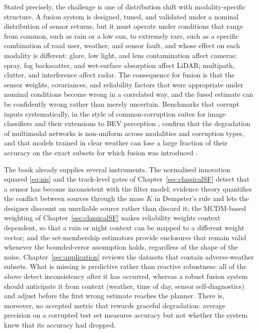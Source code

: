 \documentclass[graybox,envcountchap]{style/SNmono}
\begin{document}
Stated precisely, the challenge is one of distribution shift with modality-specific structure. A fusion system is designed, tuned, and validated under a nominal distribution of sensor returns, but it must operate under conditions that range from common, such as rain or a low sun, to extremely rare, such as a specific combination of road user, weather, and sensor fault, and whose effect on each modality is different: glare, low light, and lens contamination affect cameras; spray, fog backscatter, and wet-surface absorption affect LiDAR; multipath, clutter, and interference affect radar. The consequence for fusion is that the sensor weights, covariances, and reliability factors that were appropriate under nominal conditions become wrong in a correlated way, and the fused estimate can be confidently wrong rather than merely uncertain. Benchmarks that corrupt inputs systematically, in the style of common-corruption suites for image classifiers \cite{hendrycks2019_corruptions} and their extensions to BEV perception \cite{dong2023_robobev}, confirm that the degradation of multimodal networks is non-uniform across modalities and corruption types, and that models trained in clear weather can lose a large fraction of their accuracy on the exact subsets for which fusion was introduced \cite{bijelic2020_stf,feng2021_multimodal_survey}.

The book already supplies several instruments. The normalised innovation squared \eqref{eq:nis} and the track-level gates of Chapter~\ref{sec:classicalSF} detect that a sensor has become inconsistent with the filter model; evidence theory quantifies the conflict between sources through the mass $K$ in Dempster's rule and lets the designer discount an unreliable source rather than discard it; the MCDM-based weighting of Chapter~\ref{sec:classicalSF} makes reliability weights context dependent, so that a rain or night context can be mapped to a different weight vector; and the set-membership estimators provide enclosures that remain valid whenever the bounded-error assumption holds, regardless of the shape of the noise. Chapter~\ref{sec:application} reviews the datasets that contain adverse-weather subsets. What is missing is predictive rather than reactive robustness: all of the above detect inconsistency after it has occurred, whereas a robust fusion system should anticipate it from context (weather, time of day, sensor self-diagnostics) and adjust before the first wrong estimate reaches the planner. There is, moreover, no accepted metric that rewards graceful degradation: average precision on a corrupted test set measures accuracy but not whether the system knew that its accuracy had dropped.
\end{document}

